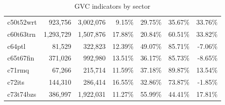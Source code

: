 \documentclass[11pt,a4paper]{article}
\begin{document}
\begin{table}[h]
\begin{tabular}{lrrrrrr}
    c50t52wrt & 923,756 & 3,002,076 & 9.15\% & 29.75\% & 35.67\% & 33.76\% \\
    c60t63trn & 1,293,729 & 1,507,876 & 17.88\% & 20.84\% & 60.51\% & 33.82\% \\
    c64ptl & 81,529 & 322,823 & 12.39\% & 49.07\% & 85.71\% & -7.06\% \\
    c65t67fin & 371,026 & 992,980 & 13.51\% & 36.17\% & 85.73\% & -8.65\% \\
    c71rmq & 67,266 & 215,714 & 11.59\% & 37.18\% & 89.87\% & 13.54\% \\
    c72its & 144,310 & 286,414 & 16.55\% & 32.86\% & 73.87\% & -1.85\% \\
    c73t74bzs & 386,997 & 1,922,031 & 11.27\% & 55.99\% & 44.41\% & 17.81\% \\
    \bottomrule
    \end{tabular}
      \caption{GVC indicators by sector}
  \label{tab:gvc_s}
\end{table}
\end{document}

